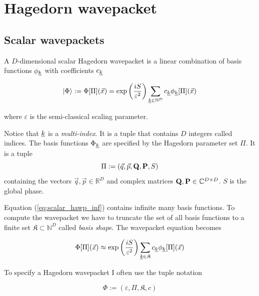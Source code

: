 \documentclass{article}
\begin{document}
\section{Hagedorn wavepacket}
\subsection{Scalar wavepackets}
A \(D\)-dimensional scalar Hagedorn wavepacket is a linear combination of basis functions \(\phi_{\underline{k}}\)
with coefficients \(c_{\underline{k}}\)

\begin{equation}
  \label{eq:scalar_hawp_inf}
  \ket{\Phi} := \Phi[\Pi](\vec{x}) = \exp{\left(\frac{iS}{\varepsilon^2}\right)} 
  \sum_{\underline{k} \in \mathbb{N}^D} c_{\underline{k}}\phi_{\underline{k}}[\Pi](\vec{x})
\end{equation}

where \(\varepsilon\) is the semi-classical scaling parameter.\par
Notice that \(\underline{k}\) is a \emph{multi-index}. It is a tuple that
contains \(D\) integers called indices.
The basis functions \(\Phi_{\underline{k}}\) are specified by the
Hagedorn parameter set \(\Pi\). It is a tuple
\[
  \Pi := \left(\vec{q},\vec{p},\mathbf{Q},\mathbf{P},S\right)
\]
containing the vectors \( \vec{q},\vec{p} \in \mathbb{R}^D \) and
complex matrices \( \mathbf{Q},\mathbf{P} \in \mathbb{C}^{D \times D} \). \(S\) is
the global phase.

Equation (\ref{eq:scalar_hawp_inf}) contains infinite many basis functions.
To compute the wavepacket we have to truncate the set of all basis functions to
a finite set \(\mathfrak{K} \subset \mathbb{N}^D\) called \emph{basis shape}.
The wavepacket equation becomes

\[
  \Phi[\Pi](\vec{x}) \approx \exp{\left(\frac{iS}{\varepsilon^2}\right)} 
  \sum_{\underline{k} \in \mathfrak{K}}c_{\underline{k}}\phi_{\underline{k}}[\Pi](\vec{x})
\]

To specify a Hagedorn wavepacket I often use the tuple notation

\[
  \Phi := \left(\varepsilon,\Pi,\mathfrak{K},c\right)
\]
\end{document}
